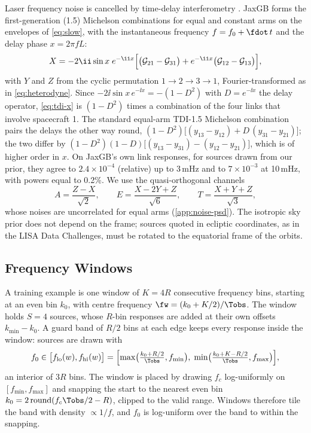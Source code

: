 Laser frequency noise is cancelled by time-delay interferometry
\citep[TDI;][]{tinto2021time}. JaxGB forms the first-generation (1.5) Michelson
combinations for equal and constant arms on the envelopes of \cref{eq:slow}, with the
instantaneous frequency $f = f_0 + \fdot\,t$ and the delay phase $x = 2\pi fL$:
\begin{equation}
  X = -2\ii\sin x\;e^{-\ii x}\Bigl[\bigl(\mathcal G_{21} - \mathcal G_{31}\bigr)
  + e^{-\ii x}\bigl(\mathcal G_{12} - \mathcal G_{13}\bigr)\Bigr],
  \label{eq:tdi-x}
\end{equation}
with $Y$ and $Z$ from the cyclic permutation $1\to2\to3\to1$, Fourier-transformed as in
\cref{eq:heterodyne}. Since $-2\ii\sin x\,e^{-\ii x} = -(1 - D^2)$ with $D = e^{-\ii x}$ the
delay operator, \cref{eq:tdi-x} is $(1-D^2)$ times a combination of the four links that
involve spacecraft 1. The standard equal-arm TDI-1.5 Michelson combination
\citep[eq.~14]{babak2021lisa} pairs the delays the other way round,
$(1-D^2)\bigl[(y_{13}-y_{12}) + D\,(y_{31}-y_{21})\bigr]$; the two differ by
$(1-D^2)(1-D)\bigl[(y_{13}-y_{31}) - (y_{12}-y_{21})\bigr]$, which is of higher order in $x$.
On JaxGB's own link responses, for sources drawn from our prior, they agree to
$2.4\times10^{-4}$ (relative) up to 3\,mHz and to $7\times10^{-3}$ at 10\,mHz, with powers
equal to 0.2\%. We use the quasi-orthogonal channels \citep{prince2002lisa}
\begin{equation}
  A = \frac{Z-X}{\sqrt2},\qquad E = \frac{X-2Y+Z}{\sqrt6},\qquad T = \frac{X+Y+Z}{\sqrt3},
  \label{eq:aet}
\end{equation}
whose noises are uncorrelated for equal arms (\cref{app:noise-psd}). The isotropic sky prior
does not depend on the frame; sources quoted in ecliptic coordinates, as in the LISA Data
Challenges, must be rotated to the equatorial frame of the orbits.

\subsection{Frequency Windows}
\label{app:signal-windows}

A training example is one window of $K=4R$ consecutive frequency bins, starting at an even
bin $k_0$, with centre frequency $\fw = (k_0 + K/2)/\Tobs$. The window holds $S=4$ sources,
whose $R$-bin responses are added at their own offsets $k_{\min}-k_0$. A guard band of $R/2$
bins at each edge keeps every response inside the window: sources are drawn with
\begin{equation}
  f_0 \in \bigl[f_{\rm lo}(w), f_{\rm hi}(w)\bigr]
  = \Bigl[\max\bigl(\tfrac{k_0 + R/2}{\Tobs}, f_{\min}\bigr),\;
          \min\bigl(\tfrac{k_0 + K - R/2}{\Tobs}, f_{\max}\bigr)\Bigr],
  \label{eq:window-interior}
\end{equation}
an interior of $3R$ bins. The window is placed by drawing $f_c$ log-uniformly on
$[f_{\min}, f_{\max}]$ and snapping the start to the nearest even bin
$k_0 = 2\operatorname{round}(f_c\Tobs/2 - R)$, clipped to the valid range. Windows therefore
tile the band with density $\propto 1/f$, and $f_0$ is log-uniform over the band to within
the snapping.

